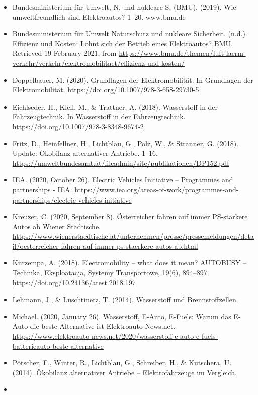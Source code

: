 \documentclass[
]{book}
\providecommand{\tightlist}{%
  \setlength{\itemsep}{0pt}\setlength{\parskip}{0pt}}
\begin{document}
\begin{itemize}
\tightlist
\item
  Bundesministerium für Umwelt, N. und nukleare S. (BMU). (2019). Wie umweltfreundlich sind Elektroautos? 1--20. www.bmu.de
\item
  Bundesministerium für Umwelt Naturschutz und nukleare Sicherheit. (n.d.). Effizienz und Kosten: Lohnt sich der Betrieb eines Elektroautos? \textbar{} BMU. Retrieved 19 February 2021, from \url{https://www.bmu.de/themen/luft-laerm-verkehr/verkehr/elektromobilitaet/effizienz-und-kosten/}
\item
  Doppelbauer, M. (2020). Grundlagen der Elektromobilität. In Grundlagen der Elektromobilität. \url{https://doi.org/10.1007/978-3-658-29730-5}
\item
  Eichlseder, H., Klell, M., \& Trattner, A. (2018). Wasserstoff in der Fahrzeugtechnik. In Wasserstoff in der Fahrzeugtechnik. \url{https://doi.org/10.1007/978-3-8348-9674-2}
\item
  Fritz, D., Heinfellner, H., Lichtblau, G., Pölz, W., \& Stranner, G. (2018). Update: Ökobilanz alternativer Antriebe. 1--16. \url{https://umweltbundesamt.at/fileadmin/site/publikationen/DP152.pdf}
\item
  IEA. (2020, October 26). Electric Vehicles Initiative -- Programmes and partnerships - IEA. \url{https://www.iea.org/areas-of-work/programmes-and-partnerships/electric-vehicles-initiative}
\item
  Kreuzer, C. (2020, September 8). Österreicher fahren auf immer PS-stärkere Autos ab \textbar{} Wiener Städtische. \url{https://www.wienerstaedtische.at/unternehmen/presse/pressemeldungen/detail/oesterreicher-fahren-auf-immer-ps-staerkere-autos-ab.html}
\item
  Kurzempa, A. (2018). Electromobility -- what does it mean? AUTOBUSY -- Technika, Eksploatacja, Systemy Transportowe, 19(6), 894--897. \url{https://doi.org/10.24136/atest.2018.197}
\item
  Lehmann, J., \& Luschtinetz, T. (2014). Wasserstoff und Brennstoffzellen.
\item
  Michael. (2020, January 26). Wasserstoff, E-Auto, E-Fuels: Warum das E-Auto die beste Alternative ist \textbar{} Elektroauto-News.net. \url{https://www.elektroauto-news.net/2020/wasserstoff-e-auto-e-fuels-batterieauto-beste-alternative}
\item
  Pötscher, F., Winter, R., Lichtblau, G., Schreiber, H., \& Kutschera, U. (2014). Ökobilanz alternativer Antriebe -- Elektrofahrzeuge im Vergleich.
\item

\end{itemize}
\end{document}

